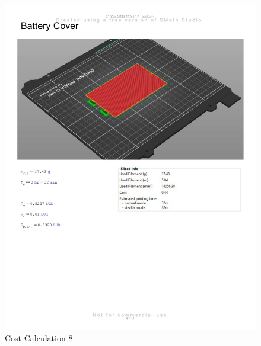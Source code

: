 \begin{figure}[H]
    \centering
    \includegraphics[width=\linewidth]{texs/appendix/data/cost1-08.jpg}
    \caption{Cost Calculation 8}
    \label{fig:cost-calculation-8}
\end{figure}

